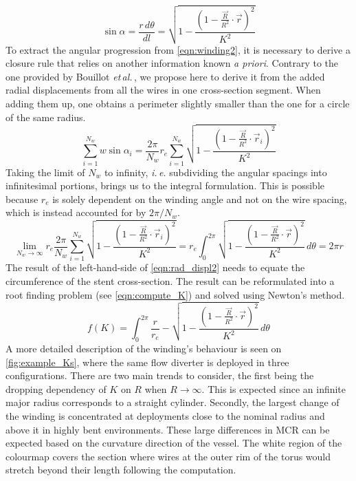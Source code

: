 \begin{equation}
	\sin{\alpha} = \frac{r\,d\theta}{dl} = \sqrt{1 -{\frac{ {\left(1 -  \frac{\vec{R}}{R^2}\cdot \vec{r}\right)}^2}{{K}^2}}}
	\label{eqn:winding2}
\end{equation}
To extract the angular progression from \autoref{eqn:winding2}, it is necessary to derive a closure rule that relies on another information known \textit{a priori}. Contrary to the one provided by Bouillot \textit{et\,al.}\,\cite{Bouillot2016}, we propose here to derive it from the added radial displacements from all the wires in one cross-section segment. When adding them up, one obtains a perimeter slightly smaller than the one for a circle of the same radius.
\begin{equation}
	\sum_{i=1}^{N_w} w\sin{\alpha_i} = \frac{2\pi}{N_w}r_e \sum_{i=1}^{N_w} \sqrt{1 -{\frac{ {\left(1 -  \frac{\vec{R}}{R^2}\cdot \vec{r}_i\right)}^2}{{K}^2}}}
	\label{eqn:rad_displ}
\end{equation}
Taking the limit of $N_w$ to infinity, \textit{i.\,e.} subdividing the angular spacings into infinitesimal portions, brings us to the integral formulation. This is possible because $r_e$ is solely dependent on the winding angle and not on the wire spacing, which is instead accounted for by $2\pi/N_w$.
\begin{equation}
	\lim_{N_w\rightarrow\infty} r_e\frac{2\pi}{N_w} \sum_{i=1}^{N_w} \sqrt{1 -{\frac{ {\left(1 -  \frac{\vec{R}}{R^2}\cdot \vec{r}_i\right)}^2}{{K}^2}}} = r_e \int_0^{2\pi} \sqrt{1 -{\frac{ {\left(1 -  \frac{\vec{R}}{R^2}\cdot \vec{r}\right)}^2}{{K}^2}}}\,d\theta = 2\pi r
	\label{eqn:rad_displ2}
\end{equation}
The result of the left-hand-side of \autoref{eqn:rad_displ2} needs to equate the circumference of the stent cross-section.
The result can be reformulated into a root finding problem (see \autoref{eqn:compute_K}) and solved using Newton's method.
\begin{equation}
	f(K) = \int_{0}^{2\pi}{ \frac{r}{r_e} - \sqrt{1 -{\frac{ {\left(1 -  \frac{\vec{R}}{R^2}\cdot \vec{r}\right)}^2}{K^2}}}}\,d\theta
	\label{eqn:compute_K}
\end{equation}
A more detailed description of the winding's behaviour is seen on \autoref{fig:example_Ks}, where the same flow diverter is deployed in three configurations. There are two main trends to consider, the first being the dropping dependency of $K$ on $R$ when $R\rightarrow\infty$. This is expected since an infinite major radius corresponds to a straight cylinder. Secondly, the largest change of the winding is concentrated at deployments close to the nominal radius and above it in highly bent environments. These large differences in MCR can be expected based on the curvature direction of the vessel. The white region of the colourmap covers the section where wires at the outer rim of the torus would stretch beyond their length following the computation.
